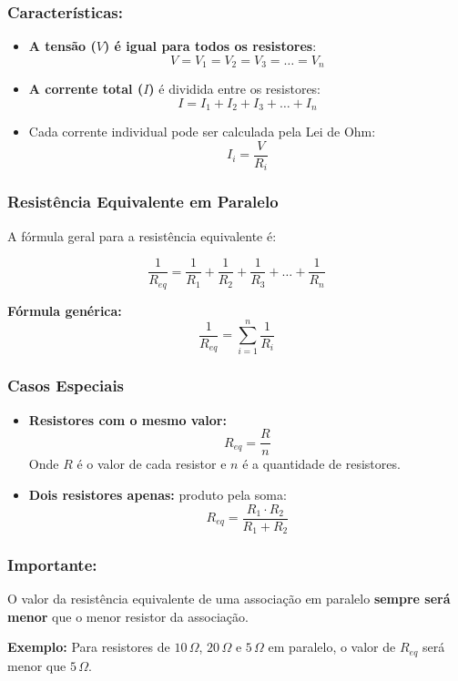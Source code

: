 \subsubsection{Características:}
\begin{itemize}
    \item \textbf{A tensão ($V$) é igual para todos os resistores}:
    \[
    V = V_1 = V_2 = V_3 = \dots = V_n
    \]
    \item \textbf{A corrente total ($I$)} é dividida entre os resistores:
    \[
    I = I_1 + I_2 + I_3 + \dots + I_n
    \]
    \item Cada corrente individual pode ser calculada pela Lei de Ohm:
    \[
    I_i = \frac{V}{R_i}
    \]
\end{itemize}

\subsubsection{Resistência Equivalente em Paralelo}
A fórmula geral para a resistência equivalente é:

\[
\frac{1}{R_{eq}} = \frac{1}{R_1} + \frac{1}{R_2} + \frac{1}{R_3} + \dots + \frac{1}{R_n}
\]

\textbf{Fórmula genérica:}
\[
\frac{1}{R_{eq}} = \sum_{i=1}^{n} \frac{1}{R_i}
\]

\subsubsection{Casos Especiais}
\begin{itemize}
    \item \textbf{Resistores com o mesmo valor:}
    \[
    R_{eq} = \frac{R}{n}
    \]
    Onde $R$ é o valor de cada resistor e $n$ é a quantidade de resistores.

    \item \textbf{Dois resistores apenas:} produto pela soma:
    \[
    R_{eq} = \frac{R_1 \cdot R_2}{R_1 + R_2}
    \]
\end{itemize}

\subsubsection{Importante:}
O valor da resistência equivalente de uma associação em paralelo \textbf{sempre será menor} que o menor resistor da associação.

\textbf{Exemplo:}
Para resistores de $10\,\Omega$, $20\,\Omega$ e $5\,\Omega$ em paralelo, o valor de $R_{eq}$ será menor que $5\,\Omega$.


